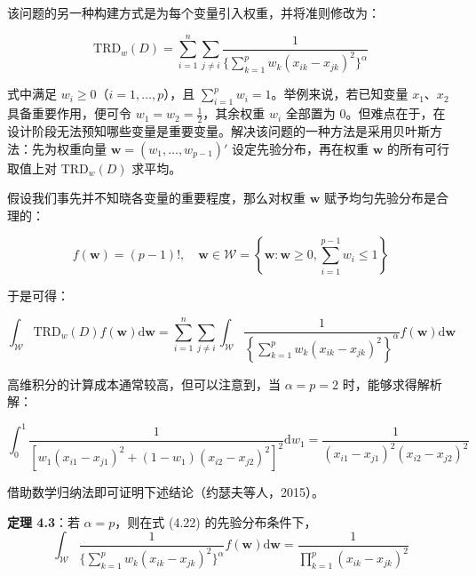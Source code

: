 \documentclass{ctexart}
\begin{document}
该问题的另一种构建方式是为每个变量引入权重，并将准则修改为：

\begin{equation*}
\mathrm{TRD}_w(D)=\sum_{i=1}^{n}\sum_{j\neq i}\frac{1}{\{\sum_{k=1}^{p}w_k(x_{ik}-x_{jk})^2\}^\alpha}
\end{equation*}

式中满足 $w_i\ge0$（$i=1,\dots,p$），且 $\sum_{i=1}^{p}w_i=1$。举例来说，若已知变量 $x_1$、$x_2$ 具备重要作用，便可令 $w_1=w_2=\frac12$，其余权重 $w_i$ 全部置为 0。但难点在于，在设计阶段无法预知哪些变量是重要变量。解决该问题的一种方法是采用贝叶斯方法：先为权重向量 $\boldsymbol{w}=(w_1,\dots,w_{p-1})'$ 设定先验分布，再在权重 $\boldsymbol{w}$ 的所有可行取值上对 $\mathrm{TRD}_w(D)$ 求平均。

假设我们事先并不知晓各变量的重要程度，那么对权重 $\boldsymbol{w}$ 赋予均匀先验分布是合理的：

\begin{equation*}
f(\boldsymbol{w})=(p-1)!,\quad\boldsymbol{w}\in\mathcal{W}=\left\{\boldsymbol{w}:\boldsymbol{w}\ge 0,\sum_{i=1}^{p-1} w_i\le 1\right\}
\tag{4.22}
\end{equation*}

于是可得：

\begin{equation*}
\int_{\mathcal{W}}\mathrm{TRD}_w(D)f(\boldsymbol{w})\mathrm{d}\boldsymbol{w}=\sum_{i=1}^n\sum_{j\ne i}\int_{\mathcal{W}}\frac{1}{\left\{\sum_{k=1}^p w_k(x_{ik}-x_{jk})^2\right\}^\alpha}f(\boldsymbol{w})\mathrm{d}\boldsymbol{w}
\end{equation*}

高维积分的计算成本通常较高，但可以注意到，当 $\alpha=p=2$ 时，能够求得解析解：

\begin{equation*}
\int_0^1\frac{1}{\left[w_1(x_{i1}-x_{j1})^2 + (1-w_1)(x_{i2}-x_{j2})^2\right]^2}\mathrm{d}w_1=\frac{1}{(x_{i1}-x_{j1})^2(x_{i2}-x_{j2})^2}
\end{equation*}

借助数学归纳法即可证明下述结论（约瑟夫等人，2015）。

\begin{mdquote}
\textbf{定理 4.3}：若 $\alpha=p$，则在式 (4.22) 的先验分布条件下，\begin{equation*}
\int_{\mathcal{W}}\frac{1}{\{\sum_{k=1}^{p}w_{k}(x_{ik}-x_{jk})^{2}\}^{\alpha}}f(\boldsymbol{w})\mathrm{d}\boldsymbol{w}=\frac{1}{\prod_{k=1}^{p}(x_{ik}-x_{jk})^{2}}
\end{equation*}
\end{mdquote}
\end{document}
